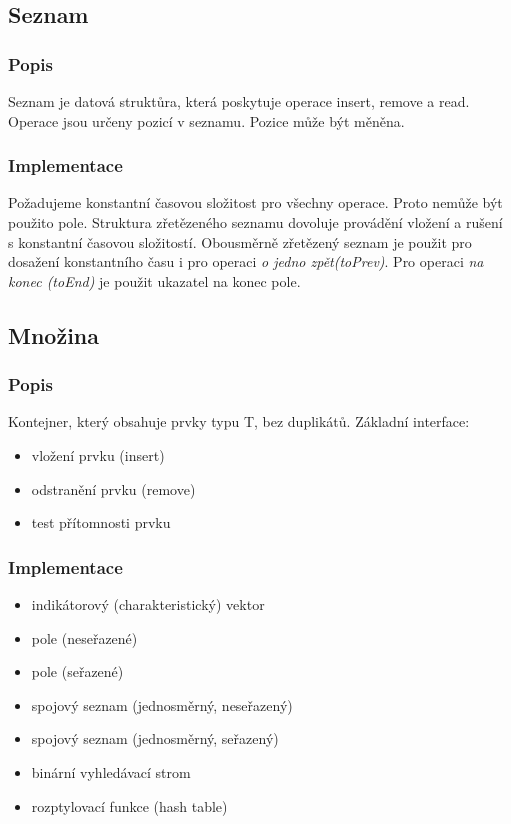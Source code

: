 \documentclass{szzclass}
\begin{document}
\subsection{Seznam}
\subsubsection{Popis}
Seznam je datová struktůra, která poskytuje operace insert, remove a read. Operace jsou určeny pozicí v seznamu. Pozice může být měněna.
\subsubsection{Implementace}
Požadujeme konstantní časovou složitost pro všechny operace. Proto nemůže být použito pole. Struktura zřetězeného seznamu dovoluje provádění vložení
a rušení s konstantní časovou složitostí. Obousměrně zřetězený seznam je použit pro dosažení konstantního času i pro operaci \textit{o jedno zpět(toPrev)}.
Pro operaci \textit{na konec (toEnd)} je použit ukazatel na konec pole.

\subsection{Množina}
\subsubsection{Popis}
Kontejner, který obsahuje prvky typu T, bez duplikátů. Základní interface:
\begin{itemize}
    \item vložení prvku (insert)
    \item odstranění prvku (remove)
    \item test přítomnosti prvku
\end{itemize}
\subsubsection{Implementace}
\begin{itemize}
    \item indikátorový (charakteristický) vektor
    \item pole (neseřazené)
    \item pole (seřazené)
    \item spojový seznam (jednosměrný, neseřazený)
    \item spojový seznam (jednosměrný, seřazený)
    \item binární vyhledávací strom
    \item rozptylovací funkce (hash table)
\end{itemize}
\end{document}
